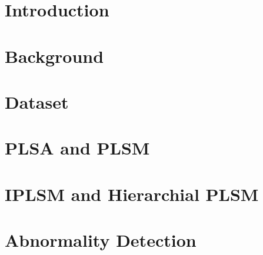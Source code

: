 \chapter{Introduction}
\chapter{Background}
\chapter{Dataset}
\chapter{PLSA and PLSM}
\chapter{IPLSM and Hierarchial PLSM}
\chapter{Abnormality Detection}
